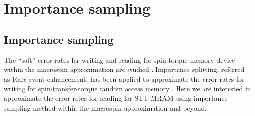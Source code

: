 \documentclass[journal,transmag]{IEEEtran}
\begin{document}




\section{Importance sampling}
\subsection{Importance sampling}
The ``soft'' error rates for writing and reading for spin-torque memory device within the macrospin approximation are studied \cite{6242414}. Importance splitting, referred as Rare event enhancement, has been applied to approximate the  error rates for writing for spin-transfer-torque random access memory \cite{7491203}. Here we are interested in approximate the error rates for reading for STT-MRAM using importance sampling method within the macrospin approximation and beyond.
\end{document}
